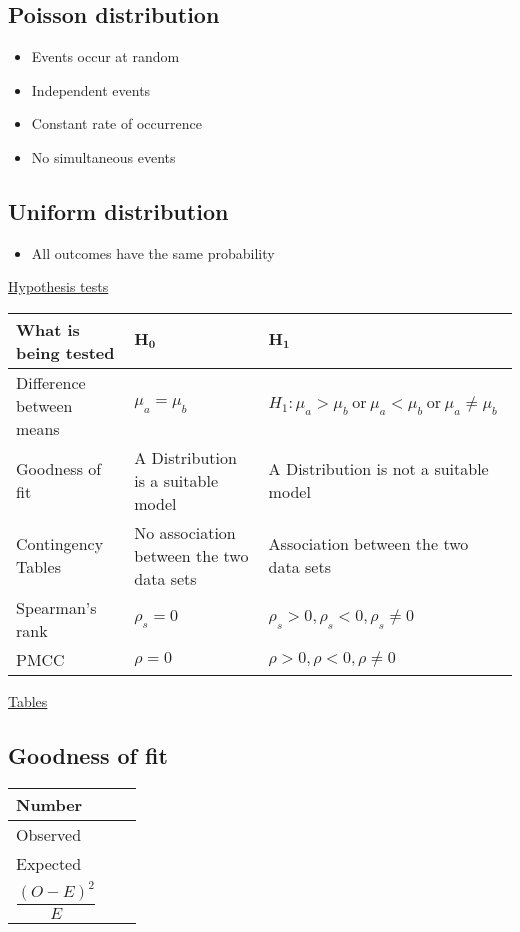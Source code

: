 \documentclass{article}[18pt]
\begin{document}
\subsection{Poisson distribution}
\begin{itemize}
\item Events occur at random
\item Independent events
\item Constant rate of occurrence
\item No simultaneous events
\end{itemize}
\subsection{Uniform distribution}
\begin{itemize}
\item All outcomes have the same probability
\end{itemize}




\newpage
\begin{center}
\underline{\huge Hypothesis tests}
\end{center}
\begin{tabularx}{\textwidth}{|X|X|X|}
\hline
\textbf{What is being tested}&$\mathbf{H_0}$&$\mathbf{H_1}$\\
\hline
Difference between means&$\mu_a=\mu_b$&$H_1:\mu_a>\mu_b \ \textrm{or} \ 
\mu_a<\mu_b \  \textrm{or} \ 
\mu_a\neq\mu_b$\\
\hline
Goodness of fit&A \underline{\hspace{1cm}} Distribution is a suitable model&A \underline{\hspace{1cm}} Distribution is not a suitable model\\
\hline
Contingency Tables&No association between the two data sets&Association between the two data sets\\
\hline
Spearman's rank&$\rho_s=0$&$\rho_s>0,\rho_s<0,\rho_s\neq0$\\
\hline
PMCC&$\rho=0$&$\rho>0,\rho<0,\rho\neq0$\\
\hline
\end{tabularx}
\begin{center}
\underline{\huge Tables}
\end{center}
\setcounter{section}{6}
\subsection{Goodness of fit}
{\renewcommand{\arraystretch}{2}
\begin{tabularx}{\textwidth}{|X|X|X|}
\hline
Number&&\\
\hline
Observed&&\\
\hline
Expected&&\\
\hline
$\dfrac{(O-E)^2}{E}$&&\\
\hline
\end{tabularx}}
\end{document}
